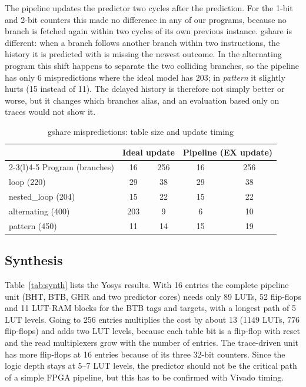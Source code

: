\documentclass[conference]{IEEEtran}
\begin{document}
The pipeline updates the predictor two cycles after the prediction. For the 1-bit and 2-bit
counters this made no difference in any of our programs, because no branch is fetched again
within two cycles of its own previous instance. gshare is different: when a branch follows
another branch within two instructions, the history it is predicted with is missing the newest
outcome. In the alternating program this shift happens to separate the two colliding branches,
so the pipeline has only 6 mispredictions where the ideal model has 203; in \emph{pattern} it
slightly hurts (15 instead of 11). The delayed history is therefore not simply better or worse,
but it changes which branches alias, and an evaluation based only on traces would not show it.

\begin{table}[!t]
\caption{gshare mispredictions: table size and update timing}
\label{tab:alias}
\centering
\small
\begin{tabular}{@{}lcccc@{}}
\toprule
 & \multicolumn{2}{c}{Ideal update} & \multicolumn{2}{c}{Pipeline (EX update)} \\
\cmidrule(lr){2-3}\cmidrule(l){4-5}
Program (branches) & 16 & 256 & 16 & 256 \\
\midrule
loop (220)        & 29  & 38 & 29 & 38 \\
nested\_loop (204) & 15  & 22 & 15 & 22 \\
alternating (400) & 203 &  9 &  6 & 10 \\
pattern (450)     & 11  & 14 & 15 & 19 \\
\bottomrule
\end{tabular}
\end{table}

\subsection{Synthesis}
Table~\ref{tab:synth} lists the Yosys results. With 16 entries the complete pipeline unit (BHT,
BTB, GHR and two predictor cores) needs only 89 LUTs, 52 flip-flops and 11 LUT-RAM blocks for the
BTB tags and targets, with a longest path of 5 LUT levels. Going to 256 entries multiplies the
cost by about 13 (1149 LUTs, 776 flip-flops) and adds two LUT levels, because each table bit is a
flip-flop with reset and the read multiplexers grow with the number of entries. The trace-driven
unit has more flip-flops at 16 entries because of its three 32-bit counters. Since the logic depth
stays at 5--7 LUT levels, the predictor should not be the critical path of a simple FPGA pipeline,
but this has to be confirmed with Vivado timing.
\end{document}
